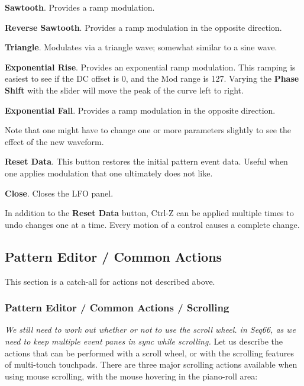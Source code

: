 \begin{enumber}
\begin{enumber}
            \item \textbf{Sawtooth}.
               Provides a ramp modulation.
            \item \textbf{Reverse Sawtooth}.
               Provides a ramp modulation in the opposite direction.
            \item \textbf{Triangle}.
               Modulates via a triangle wave; somewhat similar to a sine wave.
            \item \textbf{Exponential Rise}.
               Provides an exponential ramp modulation.
               This ramping is easiest to see if the DC offset is 0,
               and the Mod range is 127.
               Varying the \textbf{Phase Shift} with the slider
               will move the peak of the curve left to right.
            \item \textbf{Exponential Fall}. Provides a ramp modulation in the
               opposite direction.
         \end{enumber}
         Note that one might have to change one or more parameters
         slightly to see the effect of the new waveform.
      \item \textbf{Reset Data}.
         This button restores the initial pattern event data.  Useful when one
         applies modulation that one ultimately does not like.
      \item \textbf{Close}.  Closes the LFO panel.
   \end{enumber}

   In addition to the \textbf{Reset Data} button, Ctrl-Z can be applied
   multiple times to undo changes one at a time.  Every motion of a control
   causes a complete change.

\subsection{Pattern Editor / Common Actions}
\label{subsec:pattern_editor_common}

   This section is a catch-all for actions not described above.

\subsubsection{Pattern Editor / Common Actions / Scrolling}
\label{subsec:pattern_editor_scrolling}

   \textsl{We still need to work out whether or not to use the scroll wheel.
   in Seq66, as we need to keep multiple event panes in sync while scrolling.}
   Let us describe the actions that can be performed with a
   scroll wheel, or with the scrolling features of multi-touch touchpads.
   There are three major scrolling actions available when using mouse
   scrolling, with the mouse hovering in the piano-roll area:

